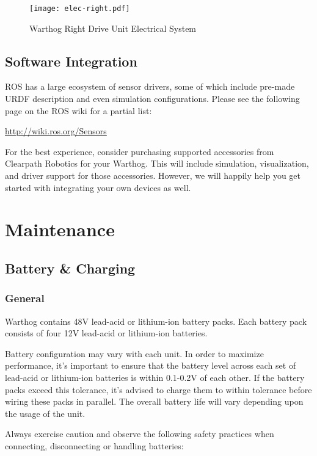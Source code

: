 \documentclass[]{clearpath-latex/clearpath-manual}
\begin{document}
\begin{figure}[!htb]
  \centering
  \texttt{[image: elec-right.pdf]}
  \caption{Warthog Right Drive Unit Electrical System}
  \label{elec-right}
\end{figure}




\subsection{Software Integration}

ROS has a large ecosystem of sensor drivers, some of which include pre-made URDF description and even simulation configurations.  Please see the following page on the ROS wiki for a partial list:

\url{http://wiki.ros.org/Sensors}

For the best experience, consider purchasing supported accessories from Clearpath Robotics for your Warthog. This will include simulation, visualization, and driver support for those accessories.  However, we will happily help you get started with integrating your own devices as well.

\section{Maintenance}

\subsection{Battery \& Charging}

\subsubsection{General}

Warthog contains 48V lead-acid or lithium-ion battery packs. Each battery pack consists of four 12V lead-acid or lithium-ion batteries.

Battery configuration may vary with each unit. In order to maximize performance, it's important to ensure that the battery level across each set of lead-acid or lithium-ion batteries is within 0.1-0.2V of each other. If the battery packs exceed this tolerance, it's advised to charge them to within tolerance before wiring these packs
in parallel. The overall battery life will vary depending upon the usage of the unit.

Always exercise caution and observe the following safety practices when connecting, disconnecting or handling batteries:
\end{document}
